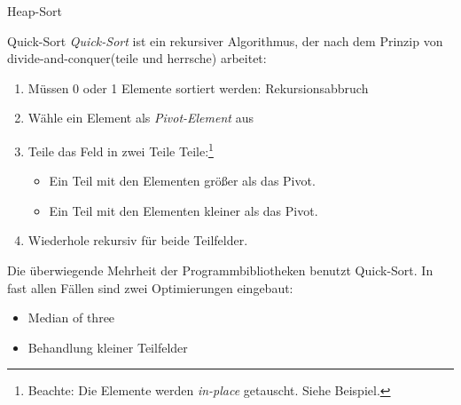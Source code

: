 \begin{algo}{Heap-Sort}
\begin{center}
    \end{center}
\end{algo}

\begin{algo}{Quick-Sort}
    \emph{Quick-Sort} ist ein rekursiver Algorithmus, der nach dem Prinzip von \glqq divide-and-conquer\grqq (\glqq teile und herrsche\grqq) arbeitet:
    \begin{enumerate}
        \item Müssen 0 oder 1 Elemente sortiert werden: Rekursionsabbruch
        \item Wähle ein Element als \emph{Pivot-Element} aus
        \item Teile das Feld in zwei Teile Teile:\footnote{Beachte: Die Elemente werden \emph{in-place} getauscht. Siehe Beispiel.}
              \begin{itemize}
                  \item Ein Teil mit den Elementen größer als das Pivot.
                  \item Ein Teil mit den Elementen kleiner als das Pivot.
              \end{itemize}
        \item Wiederhole rekursiv für beide Teilfelder.
    \end{enumerate}


    Die überwiegende Mehrheit der Programmbibliotheken benutzt Quick-Sort.
    In fast allen Fällen sind zwei Optimierungen eingebaut:
    \begin{itemize}
        \item \glqq Median of three\grqq
        \item \glqq Behandlung kleiner Teilfelder\grqq
    \end{itemize}
\end{algo}

